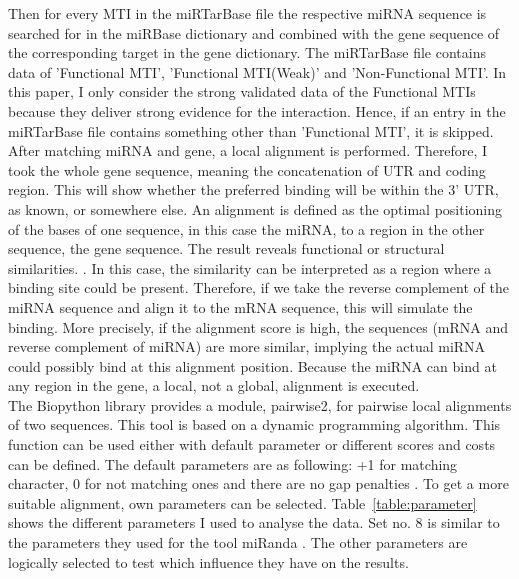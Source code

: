 \documentclass[11pt, a4paper, oneside]{book}
\begin{document}
Then for every MTI in the miRTarBase file the respective miRNA sequence is searched for in the miRBase dictionary and combined with the gene sequence of the corresponding target in the gene dictionary. The miRTarBase file contains data of 'Functional MTI', 'Functional MTI(Weak)' and 'Non-Functional MTI'. In this paper, I only consider the strong validated data of the Functional MTIs because they deliver strong evidence for the interaction. Hence, if an entry in the miRTarBase file contains something other than 'Functional MTI', it is skipped. \\

After matching miRNA and gene, a local alignment is performed. Therefore, I took the whole gene sequence, meaning the concatenation of UTR and coding region. This will show whether the preferred binding will be within the 3' UTR, as known, or somewhere else. An alignment is defined as the optimal positioning of the bases of one sequence, in this case the miRNA, to a region in the other sequence, the gene sequence. The result reveals functional or structural similarities. \cite{alignment}. In this case, the similarity can be interpreted as a region where a binding site could be present. Therefore, if we take the reverse complement of the miRNA sequence and align it to the mRNA sequence, this will simulate the binding. More precisely, if the alignment score is high, the sequences (mRNA and reverse complement of miRNA) are more similar, implying the actual miRNA could possibly bind at this alignment position. Because the miRNA can bind at any region in the gene, a local, not a global, alignment is executed.\\

The Biopython library provides a module, pairwise2, for pairwise local alignments of two sequences. This tool is based on a dynamic programming algorithm. This function can be used either with default parameter or different scores and costs can be defined. The default parameters are as following: +1 for matching character, 0 for not matching ones and there are no gap penalties \cite{pairwise}. To get a more suitable alignment, own parameters can be selected. Table~\ref{table:parameter} shows the different parameters I used to analyse the data. Set no. 8 is similar to the parameters they used for the tool miRanda \cite{Enright}. The other parameters are logically selected to test which influence they have on the results. \\\\
\end{document}
